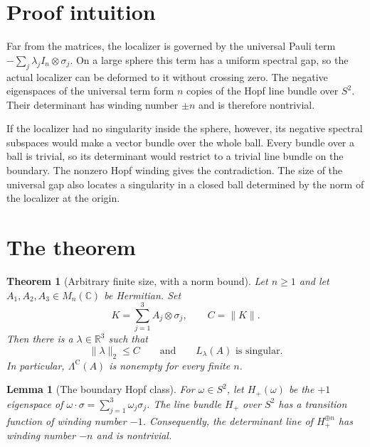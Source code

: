 \documentclass[11pt]{article}
\newtheorem{theorem}{Theorem}
\newtheorem{lemma}{Lemma}
\newcommand{\R}{\mathbb{R}}
\newcommand{\C}{\mathbb{C}}
\newcommand{\1}{I}
\begin{document}
\section{Proof intuition}

Far from the matrices, the localizer is governed by the universal Pauli term
$-\sum_j\lambda_j\1_n\otimes\sigma_j$.  On a large sphere this term has a
uniform spectral gap, so the actual localizer can be deformed to it without
crossing zero.  The negative eigenspaces of the universal term form $n$ copies
of the Hopf line bundle over $S^2$.  Their determinant has winding number
$\pm n$ and is therefore nontrivial.

If the localizer had no singularity inside the sphere, however, its negative
spectral subspaces would make a vector bundle over the whole ball.  Every
bundle over a ball is trivial, so its determinant would restrict to a trivial
line bundle on the boundary.  The nonzero Hopf winding gives the
contradiction.  The size of the universal gap also locates a singularity in a
closed ball determined by the norm of the localizer at the origin.

\section{The theorem}

\begin{theorem}[Arbitrary finite size, with a norm bound]
\label{thm:main}
Let $n\geq1$ and let $A_1,A_2,A_3\in M_n(\C)$ be Hermitian.  Set
\[
 K=\sum_{j=1}^3 A_j\otimes\sigma_j,
 \qquad C=\lVert K\rVert.
\]
Then there is a $\lambda\in\R^3$ such that
\[
 \lVert\lambda\rVert_2\leq C
 \qquad\text{and}\qquad
 L_\lambda(A)\text{ is singular}.
\]
In particular, $\Lambda^{\mathrm C}(A)$ is nonempty for every finite $n$.
\end{theorem}

\begin{lemma}[The boundary Hopf class]
\label{lem:hopf}
For $\omega\in S^2$, let $H_+(\omega)$ be the $+1$ eigenspace of
$\omega\cdot\sigma=\sum_{j=1}^3\omega_j\sigma_j$.  The line bundle $H_+$
over $S^2$ has a transition function of winding number $-1$.  Consequently,
the determinant line of $H_+^{\oplus n}$ has winding number $-n$ and is
nontrivial.
\end{lemma}
\end{document}
